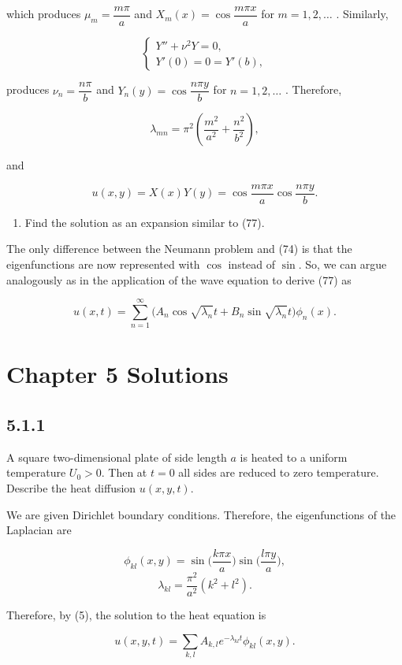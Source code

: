 \documentclass{article}
\begin{document}
which produces $\mu_m=\dfrac{m\pi}{a}$ and $X_m(x)=\cos{\dfrac{m\pi x}{a}}$ for $m=1,2,\dots$ . Similarly,

\[
  \begin{cases}
  Y''+\nu^2 Y=0, \\
  Y'(0)=0=Y'(b),
  \end{cases}
\]

produces $\nu_n=\dfrac{n\pi}{b}$ and $Y_n(y)=\cos{\dfrac{n\pi y}{b}}$ for $n=1,2,\dots$ . Therefore,

$$\lambda_{mn}=\pi^2\left(\frac{m^2}{a^2}+\frac{n^2}{b^2}\right),$$

and

$$u(x,y)=X(x)Y(y)=\cos{\dfrac{m\pi x}{a}}\cos{\dfrac{n\pi y}{b}}.$$
\begin{enumerate}[label=(\alph*),start=2]
    \item Find the solution as an expansion similar to (77).
\end{enumerate}

The only difference between the Neumann problem and (74) is that the eigenfunctions are now represented with $\cos$ instead of $\sin$. So, we can argue analogously as in the application of the wave equation to derive (77) as

$$u(x,t)=\sum_{n=1}^\infty\Big(A_n\cos\sqrt{\lambda_n}t + B_n\sin\sqrt{\lambda_n}t\Big)\phi_n(x).$$

\section{Chapter 5 Solutions}

\subsection{\textbf{5.1.1}} A square two-dimensional plate of side length $a$ is heated to a uniform temperature $U_0 > 0$. Then at $t=0$ all sides are reduced to zero temperature. Describe the heat diffusion $u(x,y,t)$.

We are given Dirichlet boundary conditions. Therefore, the eigenfunctions of the Laplacian are

$$\phi_{kl}(x,y)=\sin\Big(\frac{k\pi x}{a}\Big)\sin\Big(\frac{l\pi y}{a}\Big),$$
$$\lambda_{kl}=\frac{\pi^2}{a^2}(k^2+l^2).$$

Therefore, by (5), the solution to the heat equation is

$$u(x,y,t)=\sum_{k,l}A_{k,l}e^{-\lambda_{kl}t}\phi_{kl}(x,y).$$
\end{document}

